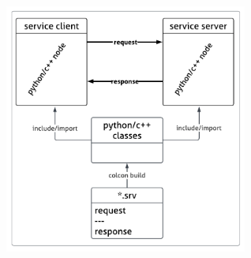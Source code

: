 \documentclass[usenames,11,dvipsnames,svgnames,x11names,aspectratio=1610,bibref]{beamer}
\newcommand{\sectionColor}[1]{\textcolor{sectionchevron}{#1}}
\newcommand{\mydisclaimer}{{\color{disclaimer}{\footnotesize Lecture 5~}}}
\newcommand\secsec{\cnordSix{\secname}~\sectionColor{\small\faChevronRight}~{\cnordFive{\small\subsecname}\hfill\mydisclaimer}}
\begin{document}
\begin{frame}[fragile]{\secsec}
\vspace*{\fill}
\begin{center} 
\includegraphics[width=8cm]{figures/lecture5/service.pdf}
\end{center}
\vspace*{\fill}
\end{frame}


\end{document}
